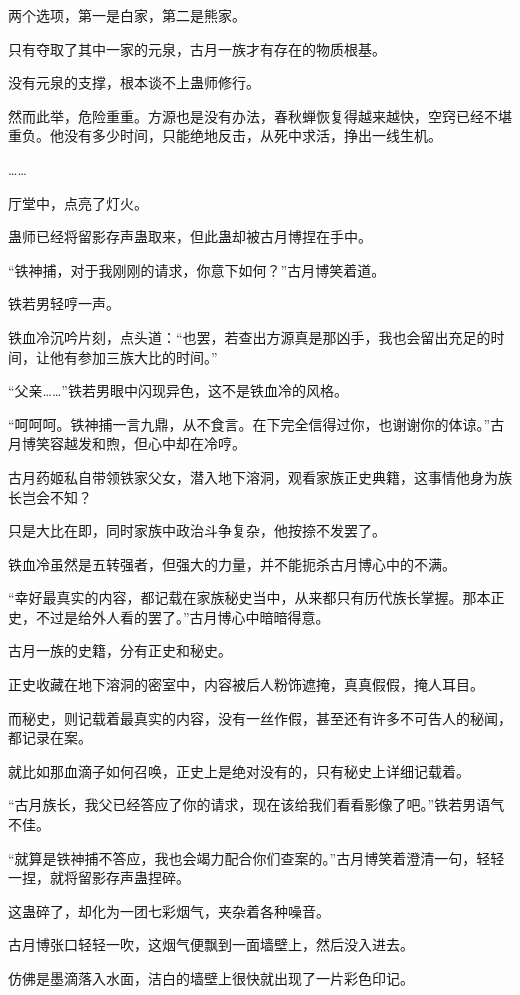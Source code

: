 \begin{this_body}
两个选项，第一是白家，第二是熊家。

只有夺取了其中一家的元泉，古月一族才有存在的物质根基。

没有元泉的支撑，根本谈不上蛊师修行。

然而此举，危险重重。方源也是没有办法，春秋蝉恢复得越来越快，空窍已经不堪重负。他没有多少时间，只能绝地反击，从死中求活，挣出一线生机。

……

厅堂中，点亮了灯火。

蛊师已经将留影存声蛊取来，但此蛊却被古月博捏在手中。

“铁神捕，对于我刚刚的请求，你意下如何？”古月博笑着道。

铁若男轻哼一声。

铁血冷沉吟片刻，点头道：“也罢，若查出方源真是那凶手，我也会留出充足的时间，让他有参加三族大比的时间。”

“父亲……”铁若男眼中闪现异色，这不是铁血冷的风格。

“呵呵呵。铁神捕一言九鼎，从不食言。在下完全信得过你，也谢谢你的体谅。”古月博笑容越发和煦，但心中却在冷哼。

古月药姬私自带领铁家父女，潜入地下溶洞，观看家族正史典籍，这事情他身为族长岂会不知？

只是大比在即，同时家族中政治斗争复杂，他按捺不发罢了。

铁血冷虽然是五转强者，但强大的力量，并不能扼杀古月博心中的不满。

“幸好最真实的内容，都记载在家族秘史当中，从来都只有历代族长掌握。那本正史，不过是给外人看的罢了。”古月博心中暗暗得意。

古月一族的史籍，分有正史和秘史。

正史收藏在地下溶洞的密室中，内容被后人粉饰遮掩，真真假假，掩人耳目。

而秘史，则记载着最真实的内容，没有一丝作假，甚至还有许多不可告人的秘闻，都记录在案。

就比如那血滴子如何召唤，正史上是绝对没有的，只有秘史上详细记载着。

“古月族长，我父已经答应了你的请求，现在该给我们看看影像了吧。”铁若男语气不佳。

“就算是铁神捕不答应，我也会竭力配合你们查案的。”古月博笑着澄清一句，轻轻一捏，就将留影存声蛊捏碎。

这蛊碎了，却化为一团七彩烟气，夹杂着各种噪音。

古月博张口轻轻一吹，这烟气便飘到一面墙壁上，然后没入进去。

仿佛是墨滴落入水面，洁白的墙壁上很快就出现了一片彩色印记。


\end{this_body}
